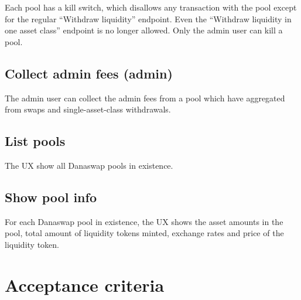 \documentclass{article}
\begin{document}
Each pool has a kill switch, which disallows any transaction with the pool
except for the regular ``Withdraw liquidity'' endpoint. Even the ``Withdraw
liquidity in one asset class'' endpoint is no longer allowed. Only the admin
user can kill a pool.

\subsection*{Collect admin fees (admin)}

The admin user can collect the admin fees from a pool which have aggregated from
swaps and single-asset-class withdrawals.

\subsection*{List pools}

The UX show all Danaswap pools in existence.

\subsection*{Show pool info}

For each Danaswap pool in existence, the UX shows the asset amounts in the pool,
total amount of liquidity tokens minted, exchange rates and price of the
liquidity token.

\section{Acceptance criteria}
\end{document}
